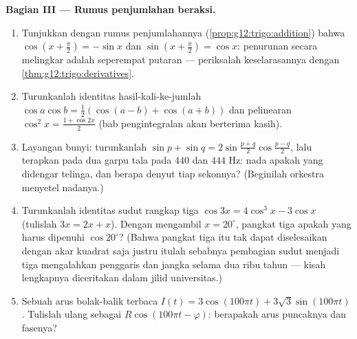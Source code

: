 \begin{problem}
\medskip
\noindent\textbf{Bagian III --- Rumus penjumlahan beraksi.}
\begin{enumerate}[resume]
  \item Tunjukkan dengan rumus penjumlahannya
        (\cref{prop:g12:trigo:addition}) bahwa
        $\cos\left(x + \frac\pi2\right) = -\sin x$ dan
        $\sin\left(x + \frac\pi2\right) = \cos x$: penurunan
        secara melingkar adalah seperempat putaran --- periksalah
        keselarasannya dengan \cref{thm:g12:trigo:derivatives}.
  \item Turunkanlah identitas hasil-kali-ke-jumlah
        $\cos a \cos b = \frac12\left(\cos(a - b) +
        \cos(a + b)\right)$ dan pelinearan
        $\cos^2 x = \frac{1 + \cos 2x}{2}$ (bab pengintegralan
        akan berterima kasih).
  \item Layangan bunyi: turunkanlah
        $\sin p + \sin q = 2 \sin\frac{p + q}{2}
        \cos\frac{p - q}{2}$, lalu terapkan pada dua garpu tala
        pada $440$ dan $444$ Hz: nada apakah yang didengar telinga, dan
        berapa denyut tiap sekonnya? (Beginilah orkestra
        menyetel nadanya.)
  \item Turunkanlah identitas sudut rangkap tiga
        $\cos 3x = 4\cos^3 x - 3\cos x$
        (tulislah $3x = 2x + x$). Dengan mengambil $x = 20^\circ$,
         pangkat tiga apakah yang harus dipenuhi
        $\cos 20^\circ$? (Bahwa  pangkat tiga itu tak dapat
        diselesaikan dengan akar kuadrat saja justru itulah sebabnya
        pembagian sudut menjadi tiga mengalahkan penggaris dan jangka
        selama dua ribu tahun --- kisah lengkapnya
        diceritakan dalam jilid universitas.)
  \item Sebuah arus bolak-balik terbaca
        $I(t) = 3\cos(100\pi t) + 3\sqrt3 \sin(100\pi t)$.
        Tulislah ulang sebagai $R\cos(100\pi t - \varphi)$: berapakah
        arus puncaknya dan fasenya?
\end{enumerate}


\end{problem}

